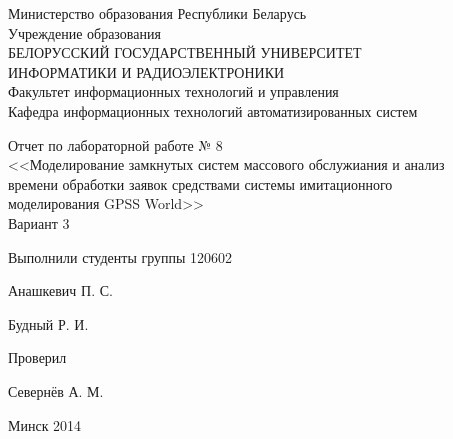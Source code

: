 \thispagestyle{empty}
\setlength{\parindent}{0ex} %

\begin{center}
  Министерство образования Республики Беларусь \\
  \vspace{0.5ex}
  Учреждение образования \\
  БЕЛОРУССКИЙ ГОСУДАРСТВЕННЫЙ УНИВЕРСИТЕТ \\
  ИНФОРМАТИКИ И РАДИОЭЛЕКТРОНИКИ \\
  \vspace{0.5ex}
  Факультет информационных технологий и управления \\
  \vspace{0.5ex}
  Кафедра информационных технологий автоматизированных систем
\end{center}

\vspace{45mm}

\begin{center}
  Отчет по лабораторной работе № 8 \\
  <<Моделирование замкнутых систем массового обслужиания и анализ \\
  времени обработки заявок средствами системы имитационного \\
  моделирования GPSS World>> \\
  Вариант 3
\end{center}

\vspace{40mm}

\begin{minipage}{.65\linewidth}
    Выполнили студенты группы 120602
    \bigskip
\end{minipage}
\hfill
\begin{minipage}{.25\linewidth}
  \begin{flushleft}
    Анашкевич П. С.

    Будный Р. И.
  \end{flushleft}
\end{minipage}

\vspace{10mm}

\begin{minipage}{.65\linewidth}
    Проверил
\end{minipage}
\hfill
\begin{minipage}{.25\linewidth}
  \begin{flushleft}
    Севернёв А. М.

  \end{flushleft}
\end{minipage}

\vspace{40mm}
\begin{center}
  Минск 2014
\end{center}

\setlength{\parindent}{5ex} %

\newpage
